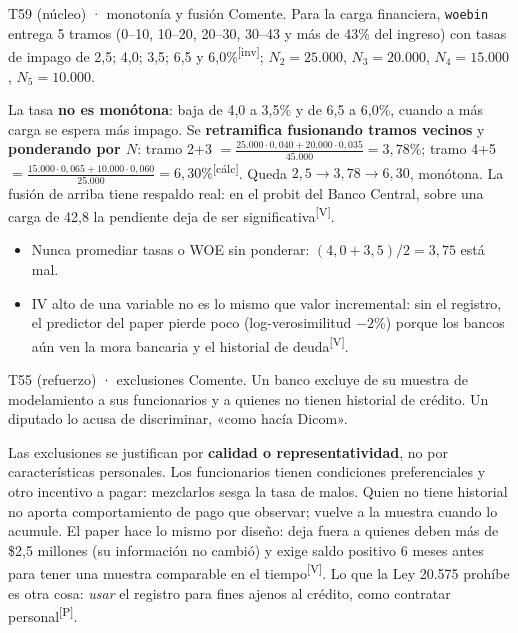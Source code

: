 \documentclass[10pt,a4paper]{article}
\newcommand{\V}{\textsuperscript{\textcolor{green!45!black}{[V]}}}
\newcommand{\Pre}{\textsuperscript{\textcolor{orange!80!black}{[P]}}}
\newcommand{\inv}{\textsuperscript{\textcolor{red!60!black}{[inv]}}}
\newcommand{\calc}{\textsuperscript{\textcolor{blue!60!black}{[cálc]}}}
\begin{document}
\begin{enun}{T59 (núcleo) · monotonía y fusión}
Comente. Para la carga financiera, \texttt{woebin} entrega 5 tramos (0--10, 10--20, 20--30, 30--43 y más de 43\% del ingreso) con tasas de impago de 2,5; 4,0; 3,5; 6,5 y 6,0\%\inv; $N_2=25.000$, $N_3=20.000$, $N_4=15.000$, $N_5=10.000$.
\end{enun}
\begin{ejemplar}
La tasa \textbf{no es monótona}: baja de 4,0 a 3,5\% y de 6,5 a 6,0\%, cuando a más carga se espera más impago. Se \textbf{retramifica fusionando tramos vecinos} y \textbf{ponderando por $N$}: tramo 2+3 $=\frac{25.000\cdot0,040+20.000\cdot0,035}{45.000}=3{,}78\%$; tramo 4+5 $=\frac{15.000\cdot0,065+10.000\cdot0,060}{25.000}=6{,}30\%$\calc. Queda $2{,}5\to3{,}78\to6{,}30$, monótona. La fusión de arriba tiene respaldo real: en el probit del Banco Central, sobre una carga de 42,8 la pendiente deja de ser significativa\V.
\end{ejemplar}
\begin{trampa}
\begin{itemize}[leftmargin=*,itemsep=0pt,topsep=0pt]
\item Nunca promediar tasas o WOE sin ponderar: $(4{,}0+3{,}5)/2=3{,}75$ está mal.
\item IV alto de una variable no es lo mismo que valor incremental: sin el registro, el predictor del paper pierde poco (log-verosimilitud $-2\%$) porque los bancos aún ven la mora bancaria y el historial de deuda\V.
\end{itemize}
\end{trampa}

\begin{enun}{T55 (refuerzo) · exclusiones}
Comente. Un banco excluye de su muestra de modelamiento a sus funcionarios y a quienes no tienen historial de crédito. Un diputado lo acusa de discriminar, «como hacía Dicom».
\end{enun}
\begin{ejemplar}
Las exclusiones se justifican por \textbf{calidad o representatividad}, no por características personales. Los funcionarios tienen condiciones preferenciales y otro incentivo a pagar: mezclarlos sesga la tasa de malos. Quien no tiene historial no aporta comportamiento de pago que observar; vuelve a la muestra cuando lo acumule. El paper hace lo mismo por diseño: deja fuera a quienes deben más de \$2,5 millones (su información no cambió) y exige saldo positivo 6 meses antes para tener una muestra comparable en el tiempo\V. Lo que la Ley 20.575 prohíbe es otra cosa: \emph{usar} el registro para fines ajenos al crédito, como contratar personal\Pre.
\end{ejemplar}
\end{document}
